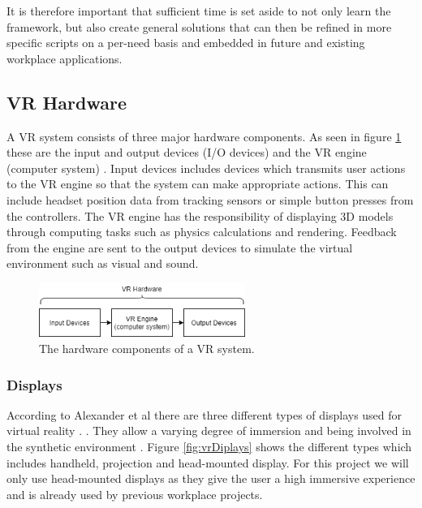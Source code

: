 It is therefore important that sufficient time is set aside to not only learn the framework, but also create general solutions that can then be refined in more specific scripts on a per-need basis and embedded in future and existing workplace applications.



\subsection{VR Hardware}
A VR system consists of three major hardware components. As seen in figure \ref{fig:vrHardware} these are the input and output devices (I/O devices) and the VR engine (computer system) \cite{bamodu2013virtual}.  
Input devices includes devices which transmits user actions to the VR engine so that the system can make appropriate actions. This can include headset position data from tracking sensors or simple button presses from the controllers. The VR engine has the responsibility of displaying 3D models through computing tasks such as physics calculations and rendering. Feedback from the engine are sent to the output devices to simulate the virtual environment such as visual and sound.         

\begin{figure}[!ht]
    \centering
    \includegraphics[width=0.6\textwidth]{fig/background/vrHardware.png}
    \caption{The hardware components of a VR system.}
    \label{fig:vrHardware}
\end{figure}

\subsubsection{Displays}
According to Alexander et al there are three different types of displays used for virtual reality . \cite{alexander2017virtual}. They allow a varying degree of immersion and being involved in the synthetic environment \cite{alexander2017virtual}. Figure \ref{fig:vrDiplays} shows the different types which includes handheld, projection and head-mounted display. For this project we will only use head-mounted displays as they give the user a high immersive experience and is already used by previous workplace projects.  


